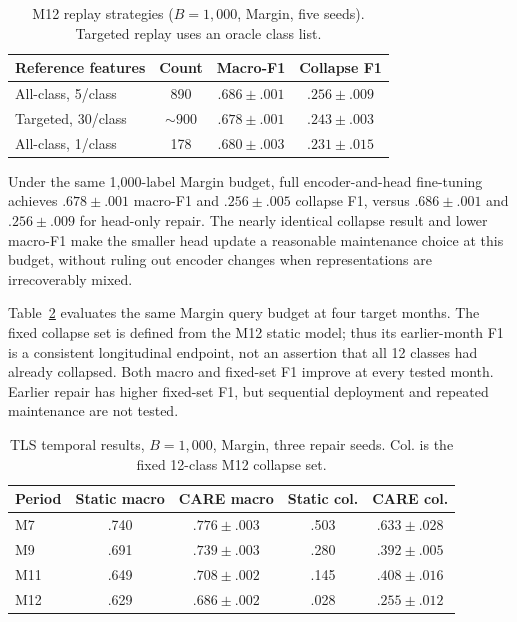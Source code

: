 \documentclass[journal]{IEEEtran}
\begin{document}
\begin{table}[!t]
\centering
\caption{M12 replay strategies ($B=1{,}000$, Margin, five seeds). Targeted replay uses an oracle class list.}
\label{tab:replay}
\scriptsize
\setlength{\tabcolsep}{4pt}
\begin{tabular}{@{}lccc@{}}
\toprule
Reference features & Count & Macro-F1 & Collapse F1\\
\midrule
All-class, 5/class & 890 & $.686\pm.001$ & $.256\pm.009$\\
Targeted, 30/class & $\sim900$ & $.678\pm.001$ & $.243\pm.003$\\
All-class, 1/class & 178 & $.680\pm.003$ & $.231\pm.015$\\
\bottomrule
\end{tabular}
\end{table}

Under the same 1,000-label Margin budget, full encoder-and-head fine-tuning achieves $.678\pm.001$ macro-F1 and $.256\pm.005$ collapse F1, versus $.686\pm.001$ and $.256\pm.009$ for head-only repair. The nearly identical collapse result and lower macro-F1 make the smaller head update a reasonable maintenance choice at this budget, without ruling out encoder changes when representations are irrecoverably mixed.

Table~\ref{tab:period} evaluates the same Margin query budget at four target months. The fixed collapse set is defined from the M12 static model; thus its earlier-month F1 is a consistent longitudinal endpoint, not an assertion that all 12 classes had already collapsed. Both macro and fixed-set F1 improve at every tested month. Earlier repair has higher fixed-set F1, but sequential deployment and repeated maintenance are not tested.

\begin{table}[!t]
\centering
\caption{TLS temporal results, $B=1{,}000$, Margin, three repair seeds. Col. is the fixed 12-class M12 collapse set.}
\label{tab:period}
\scriptsize
\setlength{\tabcolsep}{4pt}
\begin{tabular}{@{}lcccc@{}}
\toprule
Period & Static macro & CARE macro & Static col. & CARE col.\\
\midrule
M7 & .740 & $.776\!\pm\!.003$ & .503 & $.633\!\pm\!.028$\\
M9 & .691 & $.739\!\pm\!.003$ & .280 & $.392\!\pm\!.005$\\
M11 & .649 & $.708\!\pm\!.002$ & .145 & $.408\!\pm\!.016$\\
M12 & .629 & $.686\!\pm\!.002$ & .028 & $.255\!\pm\!.012$\\
\bottomrule
\end{tabular}
\end{table}
\end{document}
